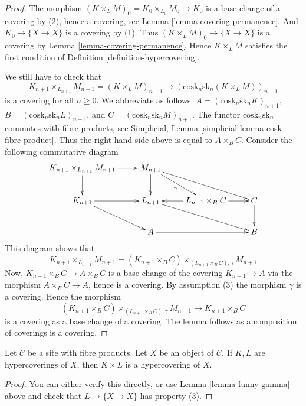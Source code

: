 \begin{proof}
The morphism $(K \times_L M)_0 = K_0 \times_{L_0} M_0 \to K_0$
is a base change of a covering by (2), hence a covering, see
Lemma \ref{lemma-covering-permanence}. And $K_0 \to \{X \to X\}$
is a covering by (1). Thus $(K \times_L M)_0 \to \{X \to X\}$
is a covering by Lemma \ref{lemma-covering-permanence}. Hence
$K\times_L M$ satisfies the first condition of Definition
\ref{definition-hypercovering}.

\medskip\noindent
We still have to check that
$$
K_{n + 1} \times_{L_{n + 1}} M_{n + 1} = (K \times_L M)_{n + 1}
\longrightarrow
(\text{cosk}_n \text{sk}_n (K\times_L M))_{n + 1}
$$
is a covering for all $n \geq 0$. We abbreviate as follows:
$A = (\text{cosk}_n \text{sk}_n K)_{n + 1}$,
$B = (\text{cosk}_n \text{sk}_n L)_{n + 1}$, and
$C = (\text{cosk}_n \text{sk}_n M)_{n + 1}$.
The functor $\text{cosk}_n \text{sk}_n$ commutes with fibre products,
see Simplicial, Lemma \ref{simplicial-lemma-cosk-fibre-product}.
Thus the right hand side above is equal to $A \times_B C$.
Consider the following commutative diagram
$$
\xymatrix{
K_{n + 1} \times_{L_{n + 1}} M_{n + 1} \ar[r] \ar[d] &
M_{n + 1} \ar[d] \ar[rd]_\gamma \ar[rrd] &
& \\
K_{n + 1} \ar[r] \ar[rd] &
L_{n + 1} \ar[rrd] &
L_{n + 1} \times_B C \ar[l] \ar[r] &
C \ar[d] \\
&
A \ar[rr] &
&
B
}
$$
This diagram shows that
$$
K_{n + 1} \times_{L_{n + 1}} M_{n + 1}
=
(K_{n + 1} \times_B C)
\times_{(L_{n + 1} \times_B C), \gamma}
M_{n + 1}
$$
Now, $K_{n + 1} \times_B C \to A\times_B C$
is a base change of the covering $K_{n + 1} \to A$
via the morphism $A \times_B C \to A$, hence is a
covering. By assumption (3) the morphism $\gamma$ is a covering.
Hence the morphism
$$
(K_{n + 1} \times_B C)
\times_{(L_{n + 1} \times_B C), \gamma}
M_{n + 1}
\longrightarrow
K_{n + 1} \times_B C
$$
is a covering as a base change of a covering.
The lemma follows as a composition of coverings
is a covering.
\end{proof}

\begin{lemma}
\label{lemma-product-hypercoverings}
Let $\mathcal{C}$ be a site with fibre products.
Let $X$ be an object of $\mathcal{C}$.
If $K, L$ are hypercoverings of $X$, then
$K \times L$ is a hypercovering of $X$.
\end{lemma}

\begin{proof}
You can either verify this directly, or use
Lemma \ref{lemma-funny-gamma} above and check that $L \to \{X \to X\}$
has property (3).
\end{proof}


